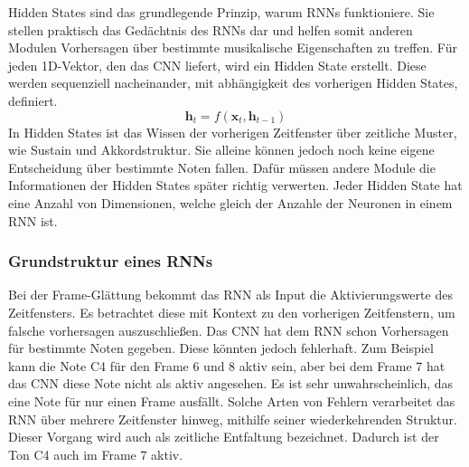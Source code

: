 \begin{description}[style=nextline]
\item[Hidden States]\label{itm:hidden}
Hidden States sind das grundlegende Prinzip, warum RNNs funktioniere.
Sie stellen praktisch das Gedächtnis des RNNs dar und helfen somit
anderen Modulen Vorhersagen über bestimmte musikalische Eigenschaften zu treffen.
Für jeden 1D-Vektor, den das CNN liefert, wird ein Hidden State erstellt.
Diese werden sequenziell nacheinander, mit abhängigkeit des vorherigen Hidden States, definiert.
\[
\mathbf{h}_t = f(\mathbf{x}_t, \mathbf{h}_{t-1})
\]
In Hidden States ist das Wissen der vorherigen Zeitfenster über zeitliche Muster, wie Sustain und Akkordstruktur.
Sie alleine können jedoch noch keine eigene Entscheidung über bestimmte Noten fallen.
Dafür müssen andere Module die Informationen der Hidden States später richtig verwerten.
Jeder Hidden State hat eine Anzahl von Dimensionen, welche gleich der Anzahle der Neuronen in einem RNN ist.
\end{description}

\subsubsection{Grundstruktur eines RNNs}
Bei der Frame-Glättung bekommt das RNN als Input die Aktivierungswerte des Zeitfensters.
Es betrachtet diese mit Kontext zu den vorherigen Zeitfenstern, um falsche vorhersagen auszuschließen.
Das CNN hat dem RNN schon Vorhersagen für bestimmte Noten gegeben.
Diese könnten jedoch fehlerhaft.
Zum Beispiel kann die Note C4 für den Frame 6 und 8 aktiv sein,
aber bei dem Frame 7 hat das CNN diese Note nicht als aktiv angesehen.
Es ist sehr unwahrscheinlich, das eine Note für nur einen Frame ausfällt.
Solche Arten von Fehlern verarbeitet das RNN über mehrere Zeitfenster hinweg, mithilfe seiner wiederkehrenden Struktur.
Dieser Vorgang wird auch als zeitliche Entfaltung bezeichnet.
Dadurch ist der Ton C4 auch im Frame 7 aktiv.

